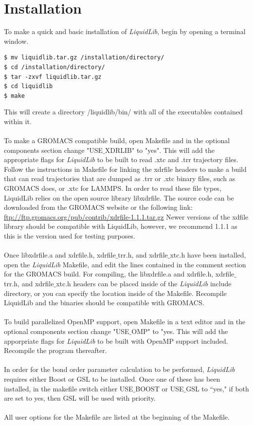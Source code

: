 \documentclass{article}
\begin{document}
\section{Installation}
To make a quick and basic installation of \textit{LiquidLib}, begin by opening a terminal window.
\begin{lstlisting}[style=BashInputStyle]
$ mv liquidlib.tar.gz /installation/directory/
$ cd /installation/directory/
$ tar -zxvf liquidlib.tar.gz
$ cd liquidlib
$ make
\end{lstlisting}
This will create a directory /liquidlib/bin/ with all of the executables contained within it.
\\
\\
To make a GROMACS compatible build, open Makefile and in the optional components section change "USE$\_$XDRLIB" to "yes".  This will add the appropriate flags for \textit{LiquidLib} to be built to read .xtc and .trr trajectory files.  Follow the instructions in Makefile for linking the xdrfile headers to make a build that can read trajectories that are dumped as .trr or .xtc binary files, such as GROMACS does, or .xtc for LAMMPS.  In order to read these file types, LiquidLib relies on the open source library libxdrfile.  The source code can be downloaded from the GROMACS website or the following link: \url{ftp://ftp.gromacs.org/pub/contrib/xdrfile-1.1.1.tar.gz} Newer versions of the xdfile library should be compatible with LiquidLib, however, we recommend 1.1.1 as this is the version used for testing purposes.
\\
\\
Once libxdrfile.a and xdrfile.h, xdrfile$\_$trr.h, and xdrfile$\_$xtc.h have been installed, open the \textit{LiquidLib} Makefile, and edit the lines contained in the comment section for the GROMACS build.  For compiling, the libxdrfile.a and xdrfile.h, xdrfile$\_$trr.h, and xdrfile$\_$xtc.h headers can be placed inside of the \textit{LiquidLib} include directory, or you can specify the location inside of the Makefile.  Recompile LiquidLib and the binaries should be compatible with GROMACS.
\\
\\
To build parallelized OpenMP support, open Makefile in a text editor and in the optional components section change "USE$\_$OMP" to "yes.  This will add the apporpriate flags for \textit{LiquidLib} to be built with OpenMP support included.  Recompile the program thereafter.
\\
\\
In order for the bond order parameter calculation to be performed, \textit{LiquidLib} requires either Boost or GSL to be installed.  Once one of these has been installed, in the makefile switch either USE$\_$BOOST or USE$\_$GSL to ``yes," if both are set to yes, then GSL will be used with priority.
\\
\\
All user options for the Makefile are listed at the beginning of the Makefile.
\end{document}
